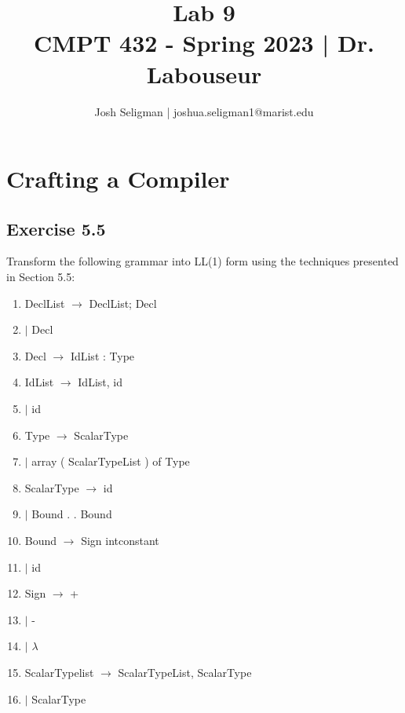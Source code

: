 \documentclass[letterpaper, 10pt, DIV=13]{scrartcl}
\title {
	\normalfont
	\huge{Lab 9} \\
	\vspace{10pt}
	\large{CMPT 432 - Spring 2023 | Dr. Labouseur}
}
\author{\normalfont Josh Seligman | joshua.seligman1@marist.edu}
\numberwithin{equation}{section}
\numberwithin{figure}{section}
\numberwithin{table}{section}
\begin{document}
\maketitle

\section{Crafting a Compiler}
\subsection{Exercise 5.5}
Transform the following grammar into LL(1) form using the techniques
presented in Section 5.5:
\begin{enumerate}
    \item DeclList $\rightarrow$ DeclList; Decl
    \item $\mid$ Decl
    \item Decl $\rightarrow$ IdList : Type
    \item IdList $\rightarrow$ IdList, id
    \item $\mid$ id
    \item Type $\rightarrow$ ScalarType
    \item $\mid$ array ( ScalarTypeList ) of Type
    \item ScalarType $\rightarrow$ id
    \item $\mid$ Bound . . Bound
    \item Bound $\rightarrow$ Sign intconstant
    \item $\mid$ id
    \item Sign $\rightarrow$ +
    \item $\mid$ - 
    \item $\mid$ $\lambda$ 
    \item ScalarTypelist $\rightarrow$ ScalarTypeList, ScalarType
    \item $\mid$ ScalarType
\end{enumerate}
\end{document}

